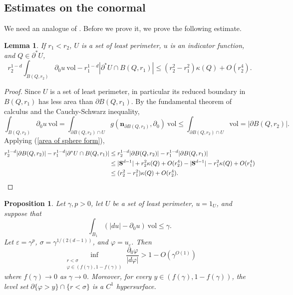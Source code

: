 \documentclass[reqno,12pt,letterpaper]{amsart}
\newcommand{\Sph}{\mathbf S}
\newcommand{\normal}{\mathbf n}
\newcommand{\vol}{\mathrm{vol}}
\newtheorem{lemma}[theorem]{Lemma}
\newtheorem{proposition}[theorem]{Proposition}
\theoremstyle{definition}
\numberwithin{equation}{section}
\begin{document}

\subsection{Estimates on the conormal}
We need an analogue of \cite[Theorem 7.3]{Giusti77}.
Before we prove it, we prove the following estimate.

\begin{lemma}\label{scalar curvature monotonicity}
If $r_1 < r_2$, $U$ is a set of least perimeter, $u$ is an indicator function, and $Q \in \partial^* U$,
$$r_2^{1 - d}\int_{B(Q, r_2)} \partial_0u ~\vol - r_1^{1 - d}|\partial^* U \cap B(Q, r_1)| \leq (r_2^2 - r_1^2)\kappa(Q) + O(r_2^4).$$
\end{lemma}
\begin{proof}
Since $U$ is a set of least perimeter, in particular its reduced boundary in $B(Q, r_1)$ has less area than $\partial B(Q, r_1)$.
By the fundamental theorem of calculus and the Cauchy-Schwarz inequality,
$$\int_{B(Q, r_2)} \partial_0u ~\vol = \int_{\partial B(Q, r_2) \cap U} g(\normal_{\partial B(Q, r_2)}, \partial_0) ~\vol \leq \int_{\partial B(Q, r_2) \cap U} \vol = |\partial B(Q, r_2)|.$$
Applying (\ref{area of sphere form}),
\begin{align*}
r_2^{1 - d}|\partial B(Q, r_2)| - r_1^{1 - d}|\partial^* U \cap B(Q, r_1)|
&\leq r_2^{1 - d}|\partial B(Q, r_2)| - r_1^{1 - d}|\partial B(Q, r_1)| \\
&\leq |\Sph^{d - 1}| + r_2^2\kappa(Q) + O(r_2^4) - |\Sph^{d - 1}| - r_1^2 \kappa(Q) + O(r_1^4)\\
&\leq (r_2^2 - r_1^2)\kappa(Q) + O(r_2^4).\qedhere
\end{align*}
\end{proof}

\begin{proposition}\label{main mollifier lemma}
Let $\gamma, p > 0$, let $U$ be a set of least perimeter, $u = 1_U$, and suppose that
\begin{equation}\label{hypothesis on main mollifier lemma}
\int_{B_1} (|du| - \partial_0 u) ~\vol \leq \gamma.
\end{equation}
Let $\varepsilon = \gamma^p$, $\sigma = \gamma^{1/(2(d - 1))}$, and $\varphi = u_\varepsilon$. Then
\begin{equation}\label{claim on main mollifier lemma}
\inf_{\substack{r < \sigma\\\varphi \in (f(\gamma), 1 - f(\gamma))}} \frac{\partial_0 \varphi}{|d\varphi|} > 1 - O(\gamma^{O(1)})
\end{equation}
where $f(\gamma) \to 0$ as $\gamma \to 0$.
Moreover, for every $y \in (f(\gamma), 1 - f(\gamma))$, the level set $\partial \{\varphi > y\} \cap \{r < \sigma\}$ is a $C^1$ hypersurface.
\end{proposition}
\end{document}
